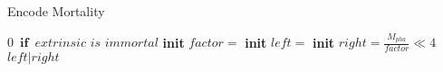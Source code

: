 \begin{algorithm}
\caption{Encode Mortality}
\begin{algorithmic}
    \Return $0 \enspace \textbf{if} \enspace \textit{extrinsic is immortal}$
    \State \textbf{init} $factor = $
    \State \textbf{init} $left = $
    \State \textbf{init} $right = \frac{M_{pha}}{factor} \ll 4$
    \Return $left|right$
\end{algorithmic}
\end{algorithm}